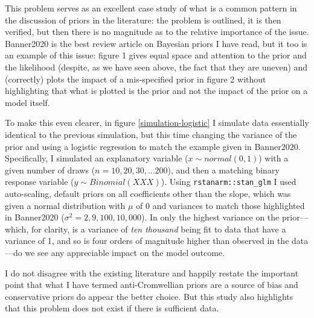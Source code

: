 \documentclass[12pt]{report}
\begin{document}
This problem serves as an excellent case study of what is a common pattern in the discussion of priors in the literature: the problem is outlined, it is then verified, but then there is no magnitude as to the relative importance of the issue. Banner2020 is the best review article on Bayesian priors I have read, but it too is an example of this issue: figure 1 gives equal space and attention to the prior and the likelihood (despite, as we have seen above, the fact that they are uneven) and (correctly) plots the impact of a mis-specified prior in figure 2 without highlighting that what is plotted is the prior and not the impact of the prior on a model itself.

To make this even clearer, in figure \ref{simulation-logistic} I simulate data essentially identical to the previous simulation, but this time changing the variance of the prior and using a logistic regression to match the example given in Banner2020. Specifically, I simulated an explanatory variable ($x \sim normal(0,1)$) with a given number of draws ($n = 10, 20, 30, ... 200$), and then a matching binary response variable ($y \sim Binomial(XXX)$). Using \texttt{rstanarm::stan\_glm} I used auto-scaling, default priors on all coefficients other than the slope, which was given a normal distribution with $\mu$ of 0 and variances to match those highlighted in Banner2020 ($\sigma^2 = 2, 9, 100, 10,000$). In only the highest variance on the prior---which, for clarity, is a variance of \emph{ten thousand} being fit to data that have a variance of 1, and so is four orders of magnitude higher than observed in the data---do we see any appreciable impact on the model outcome.

I do not disagree with the existing literature and happily restate the important point that what I have termed anti-Cromwellian priors are a source of bias and conservative priors do appear the better choice. But this study also highlights that this problem does not exist if there is sufficient data. 
\end{document}
